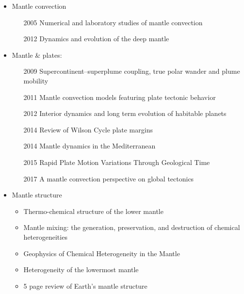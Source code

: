 \begin{itemize}
\item Mantle convection 

   \begin{itemize}
   \item [2005] Numerical and laboratory studies of mantle convection \cite{taxn05}
   \item [2012] Dynamics and evolution of the deep mantle  \cite{tack12}
   \end{itemize}

\item Mantle \& plates:
   \begin{itemize}
   \item [2009] Supercontinent–superplume coupling, true polar wander and plume mobility \cite{lizh09}
   \item [2011] Mantle convection models featuring plate tectonic behavior \cite{lowm11}
   \item [2012] Interior dynamics and long term evolution of habitable planets \cite{taab12}
   \item [2014] Review of Wilson Cycle plate margins \cite{buto14}
   \item [2014]Mantle dynamics in the Mediterranean \cite{faba14}
   \item [2015] Rapid Plate Motion Variations Through Geological Time \cite{iabu15}
   \item [2017] A mantle convection perspective on global tectonics \cite{cogu17}
   \end{itemize}

\item Mantle structure
   \begin{itemize}
   \item Thermo-chemical structure of the lower mantle \cite{dett07}
   \item Mantle mixing: the generation, preservation, and destruction of chemical heterogeneities \cite{vahb02}
   \item Geophysics of Chemical Heterogeneity in the Mantle \cite{stli12}
   \item Heterogeneity of the lowermost mantle \cite{garn00}
   \item 5 page review of Earth's mantle structure \cite{hewo01}
   \end{itemize}



\end{itemize}
